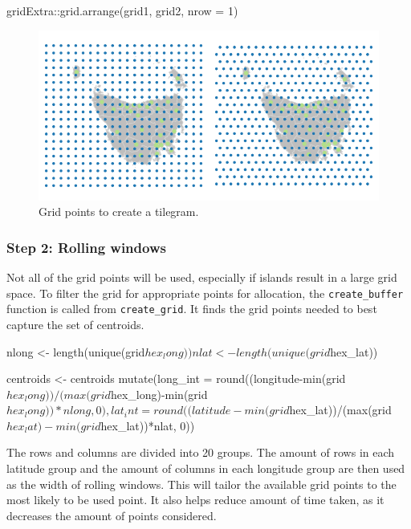 \begin{Schunk}
\begin{Sinput}
gridExtra::grid.arrange(grid1, grid2, nrow = 1)
\end{Sinput}
\begin{figure}
\includegraphics{algorithmRjournal_files/figure-latex/unnamed-chunk-2-1} \caption[Grid points to create a tilegram]{Grid points to create a tilegram.}\label{fig:unnamed-chunk-2}
\end{figure}
\end{Schunk}

\hypertarget{step-2-rolling-windows}{%
\subsubsection{Step 2: Rolling windows}\label{step-2-rolling-windows}}

Not all of the grid points will be used, especially if islands result in
a large grid space. To filter the grid for appropriate points for
allocation, the \texttt{create\_buffer} function is called from
\texttt{create\_grid}. It finds the grid points needed to best capture
the set of centroids.

\begin{Schunk}
\begin{Sinput}
nlong <- length(unique(grid$hex_long))
nlat <- length(unique(grid$hex_lat))

centroids <- centroids %
  mutate(long_int = round((longitude-min(grid$hex_long))/(max(grid$hex_long)-min(grid$hex_long))*nlong, 0),
          lat_int = round((latitude-min(grid$hex_lat))/(max(grid$hex_lat)-min(grid$hex_lat))*nlat, 0))
\end{Sinput}
\end{Schunk}

The rows and columns are divided into 20 groups. The amount of rows in
each latitude group and the amount of columns in each longitude group
are then used as the width of rolling windows. This will tailor the
available grid points to the most likely to be used point. It also helps
reduce amount of time taken, as it decreases the amount of points
considered.

